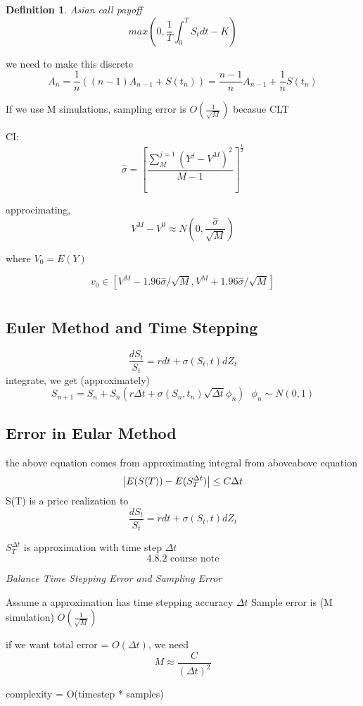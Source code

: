 \documentclass[10pt]{article}
\newcommand{\su}[2]{\sum_{#1}^{#2}}
\theoremstyle{break}
\newtheorem{defn}{Definition}[subsection]
\begin{document}
    \begin{defn}
        Asian call payoff $$max(0,\frac{1}{T}\int^T_0S_tdt -K)$$
    \end{defn}

    we need to make this discrete 
    $$A_n=\frac{1}{n}((n-1)A_{n-1}+S(t_n))=\frac{n-1}{n}A_{n-1}+\frac{1}{n}S(t_n)$$

    If we use M simulations, sampling error is $O(\frac{1}{\sqrt{M}})$ becasue CLT
  
    CI:$$\hat\sigma=\left[ \frac{\su{M}{j=1}(Y^j-V^M)^2}{M-1} \right]^{\frac{1}{2}}$$

    approcimating,$$V^M-V^0\approx N(0,\frac{\hat\sigma}{\sqrt{M}})$$

    where $V_0=E(Y)$

    $$v_0\in \left[ V^M-1.96\hat\sigma/\sqrt{M},V^M+1.96\hat\sigma/\sqrt{M} \right]$$

    \section{}
    \subsection{Euler Method and Time Stepping}
        $$\frac{dS_t}{S_t}=rdt+\sigma(S_t,t)dZ_t$$
        integrate, we get (approximately)
        $$S_{n+1}=S_n+S_n(r\Delta t+\sigma(S_n, t_n)\sqrt{\Delta t}\phi_n)~~~\phi_n\sim N(0,1)$$
    \subsection{Error in Eular Method}
        the above equation comes from approximating integral from aboveabove equation
        $$\abs{E(S(T))-E(S_T^{\Delta t})}\leq C\Delta t$$
        S(T) is a price realization to 
        $$\frac{dS_t}{S_t}=rdt+\sigma(S_t,t)dZ_t$$

        $S_T^{\Delta t}$ is approximation with time step $\Delta t$
        $$4.8.2 \text{  course note}$$

        \emph{Balance Time Stepping Error and Sampling Error} 

        Assume a approximation has time stepping accuracy $\Delta t$
        Sample error is (M simulation) $O(\frac{1}{\sqrt{M}})$

        if we want total error = $O(\Delta t)$, we need $$M\approx \frac{C}{(\Delta t)^2}$$


        complexity = O(timestep * samples) 
\end{document}
